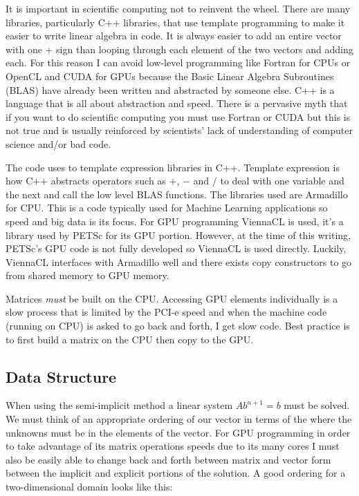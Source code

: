 \documentclass[12pt,upcase]{umlthesis}
\begin{document}
It is important in scientific computing not to reinvent the wheel. There are many libraries, particularly C++ libraries, that use template programming to make it easier to write linear algebra in code. It is always easier to add an entire vector with one + sign than looping through each element of the two vectors and adding each. For this reason I can avoid low-level programming like Fortran for CPUs or OpenCL and CUDA for GPUs because the Basic Linear Algebra Subroutines (BLAS) have already been written and abstracted by someone else. C++ is a language that is all about abstraction and speed. There is a pervasive myth that if you want to do scientific computing you must use Fortran or CUDA but this is not true and is usually reinforced by scientists' lack of understanding of computer science and/or bad code.

The code uses to template expression libraries in C++. Template expression is how C++ abstracts operators such as $+$, $-$ and $/$ to deal with one variable and the next and call the low level BLAS functions. The libraries used are Armadillo for CPU\@. This is a code typically used for Machine Learning applications so speed and big data is its focus. For GPU programming ViennaCL is used, it's a library used by PETSc for its GPU portion. However, at the time of this writing, PETSc's GPU code is not fully developed so ViennaCL is used directly. Luckily, ViennaCL interfaces with Armadillo well and there exists copy constructors to go from shared memory to GPU memory.

Matrices {\it must\/} be built on the CPU\@. Accessing GPU elements individually is a slow process that is limited by the PCI-e speed and when the machine code (running on CPU) is asked to go back and forth, I get slow code. Best practice is to first build a matrix on the CPU then copy to the GPU\@.

\subsection{Data Structure}\label{sec:datastructure}

When using the semi-implicit method a linear system $Ab^{n+1}=b$ must be solved. We must think of an appropriate ordering of our vector in terms of the where the unknowns must be in the elements of the vector. For GPU programming in order to take advantage of its matrix operations speeds due to its many cores I must also be easily able to change back and forth between matrix and vector form between the implicit and explicit portions of the solution. A good ordering for a two-dimensional domain looks like this:
\end{document}
